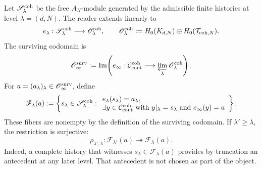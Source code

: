 Let \(\mathscr S_\lambda^{\rm coh}\) be the free \(A_N\)-module generated by the
admissible finite histories at level \(\lambda=(d,N)\). The reader extends
linearly to
\begin{equation}\label{eq:pdfv2-coh-e-lambda}
 e_\lambda:\mathscr S_\lambda^{\rm coh}
 \longrightarrow\mathscr O_\lambda^{\rm coh},
 \qquad
 \mathscr O_\lambda^{\rm coh}
 :=H_0(K_{d,N})\oplus H_0(\mathcal T_{{\rm coh},N}).
\end{equation}
The surviving codomain is
\begin{equation}\label{eq:pdfv2-coh-surviving-output}
 \mathscr O_\infty^{\rm surv}
 :=\operatorname{Im}\!\left(
 e_\infty:\mathcal C_{\rm cont}^{\rm coh}
 \longrightarrow\varprojlim_\lambda\mathscr O_\lambda^{\rm coh}
 \right).
\end{equation}
For \(a=(a_\lambda)_\lambda\in\mathscr O_\infty^{\rm surv}\), define
\begin{equation}\label{eq:pdfv2-coh-fiber}
 \mathscr F_\lambda(a):=
 \left\{s_\lambda\in\mathscr S_\lambda^{\rm coh}:
 \begin{array}{l}
 e_\lambda(s_\lambda)=a_\lambda,\\
 \exists y\in\mathcal C_{\rm cont}^{\rm coh}\text{ with }
 y|_\lambda=s_\lambda\text{ and }e_\infty(y)=a
 \end{array}
 \right\}.
\end{equation}
These fibers are nonempty by the definition of the surviving codomain. If
\(\lambda'\geq\lambda\), the restriction is surjective:
\begin{equation}\label{eq:pdfv2-coh-fiber-surjection}
 \rho_{\lambda',\lambda}:\mathscr F_{\lambda'}(a)
 \twoheadrightarrow\mathscr F_\lambda(a).
\end{equation}
Indeed, a complete history that witnesses
\(s_\lambda\in\mathscr F_\lambda(a)\) provides by truncation an
antecedent at any later level. That antecedent is not chosen as
part of the object.

